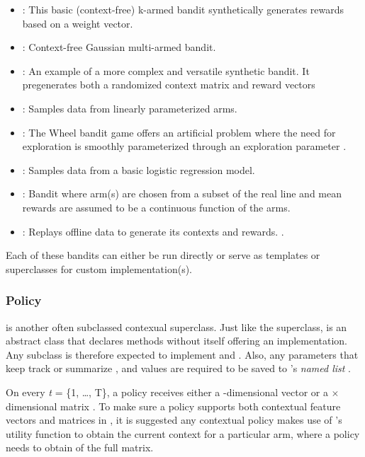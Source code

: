 \documentclass{jss}
\begin{document}
\begin{itemize}
         \item {}: This basic (context-free) k-armed bandit synthetically generates rewards based on a weight vector.
         \item {}: Context-free Gaussian multi-armed bandit.
         \item {}: An example of a more complex and versatile synthetic bandit. It pregenerates both a randomized context matrix and reward vectors
         \item {}: Samples data from linearly parameterized arms.
         \item {}: The Wheel bandit game offers an artificial problem where the need for exploration is smoothly parameterized through an exploration parameter \citep{Riquelme2018}.
         \item {}: Samples data from a basic logistic regression model.
         \item {}: Bandit where arm(s) are chosen from a subset of the real line and mean rewards are assumed to be a continuous function of the arms.
         \item {}: Replays offline data to generate its contexts and rewards.  \cite{Li2010}.
\end{itemize}

Each of these bandits can either be run directly or serve as templates or superclasses for custom  implementation(s).

\subsubsection{Policy}

 is another often subclassed contexual superclass. Just like the  superclass,  is an abstract class that declares methods without itself offering an implementation. Any  subclass is therefore expected to implement  and . Also, any parameters that keep track or summarize ,  and  values are required to be saved to 's \textit{named list} .

On every \emph{t} = \{1, \ldots, T\}, a policy receives either a -dimensional vector or a  $\times$  dimensional matrix . To make sure a policy supports both contextual feature vectors and matrices in , it is suggested any contextual policy makes use of 's  utility function to obtain the current context for a particular arm,  where a policy needs to obtain of the full  matrix.
\end{document}
